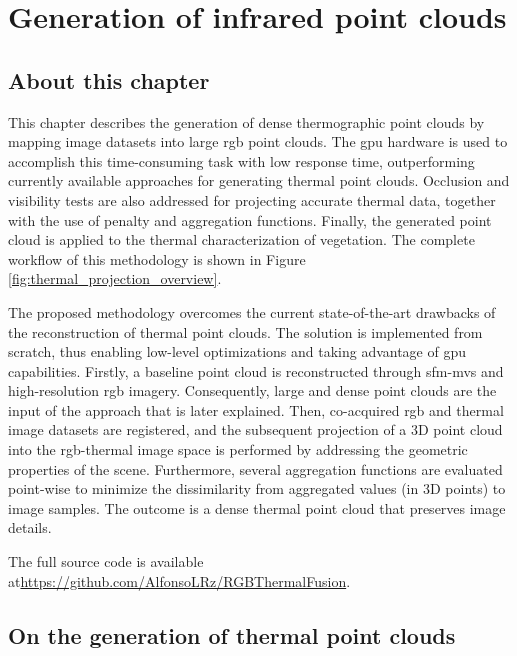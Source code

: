 \setchapterpreamble[u]{\margintoc}
\chapter{Generation of infrared point clouds}
\label{sec:thermal_pc}

\section*{About this chapter}

This chapter describes the generation of dense thermographic point clouds by mapping image datasets into large \acrshort{rgb} point clouds. The \acrshort{gpu} hardware is used to accomplish this time-consuming task with low response time, outperforming currently available approaches for generating thermal point clouds. Occlusion and visibility tests are also addressed for projecting accurate thermal data, together with the use of penalty and aggregation functions. Finally, the generated point cloud is applied to the thermal characterization of vegetation. The complete workflow of this methodology is shown in Figure \ref{fig:thermal_projection_overview}.

The proposed methodology overcomes the current state-of-the-art drawbacks of the reconstruction of thermal point clouds. The solution is implemented from scratch, thus enabling low-level optimizations and taking advantage of \acrshort{gpu} capabilities. Firstly, a baseline point cloud is reconstructed through \acrshort{sfm}-\acrshort{mvs} and high-resolution \acrshort{rgb} imagery. Consequently, large and dense point clouds are the input of the approach that is later explained. Then, co-acquired \acrshort{rgb} and thermal image datasets are registered, and the subsequent projection of a 3D point cloud into the \acrshort{rgb}-thermal image space is performed by addressing the geometric properties of the scene. Furthermore, several aggregation functions are evaluated point-wise to minimize the dissimilarity from aggregated values (in 3D points) to image samples. The outcome is a dense thermal point cloud that preserves image details.

The full source code is available at\newline \small\url{https://github.com/AlfonsoLRz/RGBThermalFusion}.\normalsize

\section{On the generation of thermal point clouds}

